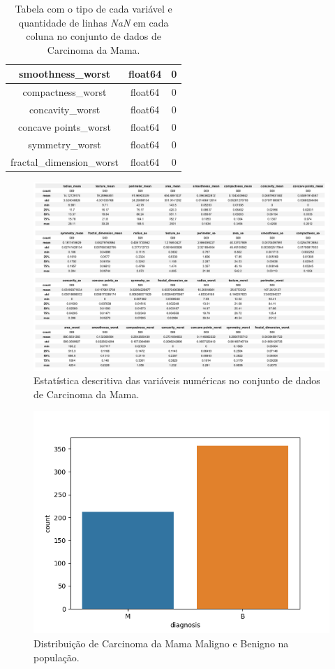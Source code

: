 \begin{table}[H]
\begin{tabular}{|c|c|c|}
\hline
smoothness\_worst      &     float64 & 0 \\
\hline
compactness\_worst     &     float64 & 0 \\
\hline
concavity\_worst       &     float64 & 0 \\
\hline
concave points\_worst  &     float64 & 0 \\
\hline
symmetry\_worst        &     float64 & 0 \\
\hline
fractal\_dimension\_worst   & float64 & 0 \\
\hline
\end{tabular}
\caption{Tabela com o tipo de cada variável e quantidade de linhas \textit{NaN} em cada coluna no conjunto de dados de Carcinoma da Mama.}
\end{table}
\begin{figure}[H]
 \centering
        \caption{Estatística descritiva das variáveis numéricas no conjunto de dados de Carcinoma da Mama.}
         \label{fig:var:cancer:desc}
\includegraphics[scale=0.3]{images/descritiva_cancer.png}
\end{figure}
\begin{figure}[H]
 \centering
        \caption{Distribuição de Carcinoma da Mama Maligno e Benigno na população.}
         \label{fig:var:cancer:tot:pop}
\includegraphics[scale=0.3]{images/cancertot.png}
\end{figure}

